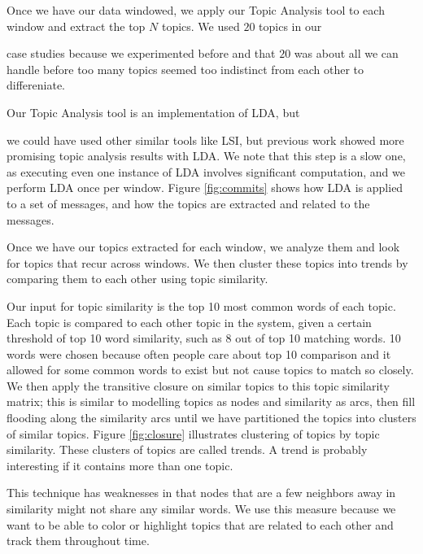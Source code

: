 \documentclass[times, 10pt,twocolumn]{article}
\newcommand{\hla}[1]{{\color{changecolor2} #1 }}
\newcommand{\shrinkit}{\vspace*{-.3em}}
\begin{document}
\shrinkit
{}
\shrinkit

Once we have our data windowed, we apply our Topic Analysis tool to
each window and extract the top $N$ topics. We used $20$ topics in our
\hla{
case studies because we experimented before and that $20$ was about
all we can handle before too many topics seemed too indistinct from
each other to differeniate.

 Our Topic Analysis tool is an implementation of LDA, but
}
we could have used other similar tools like LSI, but previous work
showed more promising topic analysis results with LDA.  We note that
this step is a slow one, as executing even one instance of LDA
involves significant computation, and we perform LDA once per window.
Figure \ref{fig:commits} shows how LDA is applied to a set of
messages, and how the topics are extracted and related to the
messages.





\shrinkit
{}
\shrinkit


Once we have our topics extracted for each window, we analyze them and
look for topics that recur across windows.  We then cluster these
topics into trends by comparing them to each other using topic similarity.

Our input for topic similarity is the top 10 most common words of each
topic.  Each topic is compared to each other topic in the system,
given a certain threshold of top 10 word similarity, such as 8 out of
\hla{
top 10 matching words.  10 words were chosen because often people care
about top 10 comparison and it allowed for some common words to exist
but not cause topics to match so closely.  We then apply the
transitive closure on similar topics to this topic similarity matrix;
this is similar to modelling topics as nodes and similarity as arcs,
then fill flooding along the similarity arcs until we have partitioned
the topics into clusters of similar topics. Figure \ref{fig:closure}
illustrates clustering of topics by topic similarity. These clusters
of topics are called trends. A trend is probably interesting if it
contains more than one topic.
}

This technique has weaknesses in that nodes that are a few neighbors
away in similarity might not share any similar words.  We use this
measure because we want to be able to color or highlight topics that
are related to each other and track them throughout time.
\end{document}
